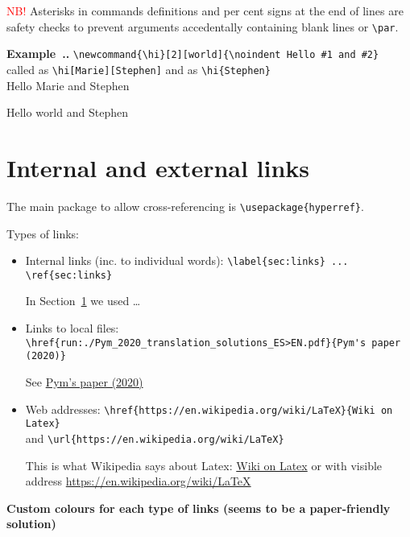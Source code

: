 \documentclass[a4paper,11pt]{article}
\newcommand{\hi}[2][world]{\noindent Hello #1 and #2}
\newcounter{example}
\newenvironment{examples}[1][]{\refstepcounter{example}\par\medskip
	\noindent \textbf{Example~\thesection.\theexample. #1} \rmfamily}{\medskip}
\begin{document}
\textcolor{red}{NB!} Asterisks in commands definitions and per cent signs at the end of lines are safety checks to prevent arguments accedentally containing blank lines or \verb|\par|.

\bigskip

\begin{examples}
	\verb|\newcommand{\hi}[2][world]{\noindent Hello #1 and #2}| \\
	called as 	\verb|\hi[Marie][Stephen]| and as \verb|\hi{Stephen}|\\
	
	\hi[Marie]{Stephen}
	
	\hi{Stephen}
\end{examples}

\clearpage

\section{Internal and external links}\label{sec:links}

The main package to allow cross-referencing is \verb|\usepackage{hyperref}|.

Types of links:

\begin{itemize}
	\item Internal links (inc. to individual words): \verb|\label{sec:links} ... \ref{sec:links}|
	
	In Section~\ref{sec:links} we used \ldots
	
	\item Links to local files: \\ \verb|\href{run:./Pym_2020_translation_solutions_ES>EN.pdf}{Pym's paper (2020)}| 
	
	See \href{run:./Pym_2020_translation_solutions_ES>EN.pdf}{Pym's paper (2020)}
	
	
	\item Web addresses: \verb|\href{https://en.wikipedia.org/wiki/LaTeX}{Wiki on Latex}| \\
and \verb|\url{https://en.wikipedia.org/wiki/LaTeX}| 

	This is what Wikipedia says about Latex: \href{https://en.wikipedia.org/wiki/LaTeX}{Wiki on Latex} or with visible address \url{https://en.wikipedia.org/wiki/LaTeX}

\end{itemize}

\textbf{Custom colours for each type of links (seems to be a paper-friendly solution)}
\end{document}
